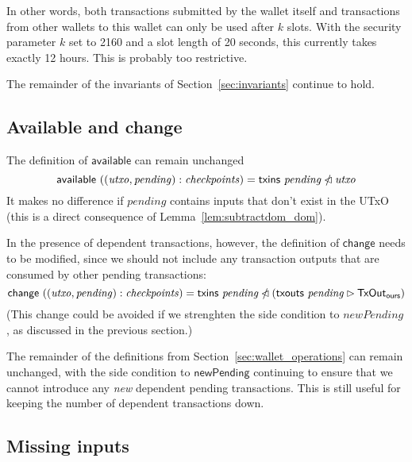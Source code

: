 \documentclass{article}
\newcommand{\restrictdom}{\lhd}
\newcommand{\subtractdom}{\mathbin{\slashed{\restrictdom}}}
\newcommand{\restrictrange}{\rhd}
\begin{document}
In other words, both transactions submitted by the wallet itself and
transactions from other wallets to this wallet can only be used after $k$ slots.
With the security parameter $k$ set to 2160 and a slot length of 20 seconds,
this currently takes exactly 12 hours. This is probably too restrictive.

The remainder of the invariants of Section~\ref{sec:invariants} continue to hold.

\subsection{Available and change}

The definition of $\mathsf{available}$ can remain unchanged
%
\begin{equation}
  \mathsf{available} ~ ((\mathit{utxo}, \mathit{pending}) : \mathit{checkpoints})
= \mathsf{txins} ~ \mathit{pending} \subtractdom \mathit{utxo} \\
\end{equation}
%
It makes no difference if  $\mathit{pending}$ contains
inputs that don't exist in the UTxO (this is a direct consequence of
Lemma~\ref{lem:subtractdom_dom}).

In the presence of dependent transactions, however, the definition of
$\mathsf{change}$ needs to be modified, since we should not include any
transaction outputs that are consumed by other pending transactions:
%
\begin{equation*}
  \mathsf{change} ~ ((\mathit{utxo}, \mathit{pending}) : \mathit{checkpoints})
= \mathsf{txins} ~ \mathit{pending} \subtractdom (\mathsf{txouts} ~ \mathit{pending} \restrictrange \mathsf{TxOut_{ours}})
\end{equation*}
%
(This change could be avoided if we strenghten the side condition to
$\mathit{newPending}$, as discussed in the previous section.)

The remainder of the definitions from Section~\ref{sec:wallet_operations} can
remain unchanged, with the side condition to $\mathsf{newPending}$ continuing to
ensure that we cannot introduce any \emph{new} dependent pending transactions.
This is still useful for keeping the number of dependent transactions down.

\subsection{Missing inputs}
\end{document}
